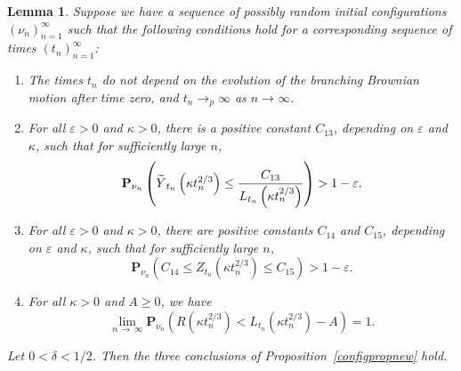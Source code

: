 \documentclass[10pt]{amsart}
\newtheorem{lemm}[theo]{Lemma}\newtheorem{prop}[theo]{Proposition}\newtheorem{coro}[theo]{Corollary}\newtheorem{conj}[theo]{Conjecture}
\theoremstyle{definition}\newtheorem{defi}[theo]{Definition}\newtheorem{rema}[theo]{Remark}\newtheorem{exam}[theo]{Example}\newtheorem{exem}[theo]{Example}\newtheorem{nota}[theo]{Notation}
\newcommand*\eps{\varepsilon}
\renewcommand*\P{\mathbf{P}}
\newcommand{\1} {\mathds{1}}
\let\oldtilde\tilde
\renewcommand*{\tilde}[1]{\mathchoice{\widetilde{#1}}{\widetilde{#1}}{\oldtilde{#1}}{\oldtilde{#1}}}
\begin{document}
\begin{lemm}\label{configlemma}
Suppose we have a sequence of possibly random initial configurations $(\nu_n)_{n=1}^{\infty}$ such that the following conditions hold for a corresponding sequence of times $(t_n)_{n=1}^{\infty}$:
\begin{enumerate}
\item\label{lemm6.1-1} The times $t_n$ do not depend on the evolution of the branching Brownian motion after time zero, and $t_n \rightarrow_p \infty$ as $n \rightarrow \infty$.

\item\label{lemm6.1-2} For all $\eps > 0$ and $\kappa > 0$, there is a positive constant $C_{13}$, depending on $\eps$ and $\kappa$, such that for sufficiently large $n$,
\begin{equation}\label{configasm2}
\P_{\nu_n} \left({\tilde Y}_{t_n}\left(\kappa t_n^{2/3}\right) \leq \frac{C_{13}}{L_{t_n}\left(\kappa t_n^{2/3}\right)} \right) > 1 - \eps.
\end{equation}

\item\label{lemm6.1-3} For all $\eps > 0$ and $\kappa > 0$, there are positive constants $C_{14}$ and $C_{15}$, depending on $\eps$ and $\kappa$, such that for sufficiently large $n$,
\begin{equation}\label{configasm3}
\P_{\nu_n}\left(C_{14} \leq Z_{t_n}\left(\kappa t_n^{2/3}\right) \leq C_{15}\right) > 1 - \eps.
\end{equation}

\item\label{lemm6.1-4} For all $\kappa > 0$ and $A \geq 0$, we have
\begin{equation}\label{configasm4}
\lim_{n\,\rightarrow\,\infty} \P_{\nu_n}\left(R\left(\kappa t_n^{2/3}\right) < L_{t_n}\left(\kappa t_n^{2/3}\right) - A \right) = 1.
\end{equation}
\end{enumerate}
Let $0 < \delta < 1/2$. Then the three conclusions of Proposition~\ref{configpropnew} hold.
\end{lemm}
\end{document}
